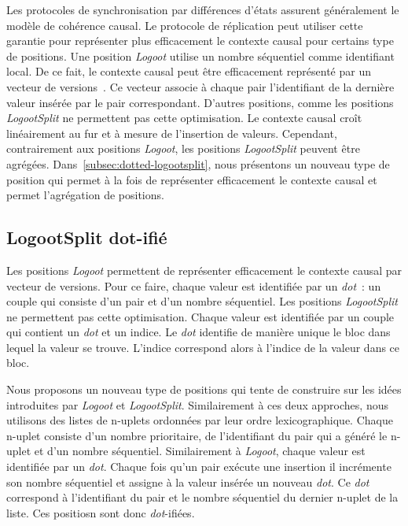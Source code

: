 Les protocoles de synchronisation par différences d'états assurent généralement le modèle de cohérence causal.
Le protocole de réplication peut utiliser cette garantie pour représenter plus efficacement le contexte causal pour certains type de positions.
Une position \emph{Logoot} utilise un nombre séquentiel comme identifiant local.
De ce fait, le contexte causal peut être efficacement représenté par un vecteur de versions~\autocite{parker_1983_versionvector,mattern_1988_timevector}.
Ce vecteur associe à chaque pair l'identifiant de la dernière valeur insérée par le pair correspondant.
D'autres positions, comme les positions \emph{LogootSplit} ne permettent pas cette optimisation.
Le contexte causal croît linéairement au fur et à mesure de l'insertion de valeurs.
Cependant, contrairement aux positions \emph{Logoot}, les positions \emph{LogootSplit} peuvent être agrégées.
Dans~\autoref{subsec:dotted-logootsplit}, nous présentons un nouveau type de position qui permet à la fois de représenter efficacement le contexte causal et permet l'agrégation de positions.


\subsection{LogootSplit dot-ifié}\label{subsec:dotted-logootsplit}

Les positions \emph{Logoot} permettent de représenter efficacement le contexte causal par vecteur de versions.
Pour ce faire, chaque valeur est identifiée par un \emph{dot}~: un couple qui consiste d'un pair et d'un nombre séquentiel.
Les positions \emph{LogootSplit} ne permettent pas cette optimisation.
Chaque valeur est identifiée par un couple qui contient un \emph{dot} et un indice.
Le \emph{dot} identifie de manière unique le bloc dans lequel la valeur se trouve.
L'indice correspond alors à l'indice de la valeur dans ce bloc.

Nous proposons un nouveau type de positions qui tente de construire sur les idées introduites par \emph{Logoot} et \emph{LogootSplit}.
Similairement à ces deux approches, nous utilisons des listes de n-uplets ordonnées par leur ordre lexicographique.
Chaque n-uplet consiste d'un nombre prioritaire, de l'identifiant du pair qui a généré le n-uplet et d'un nombre séquentiel. 
Similairement à \emph{Logoot}, chaque valeur est identifiée par un \emph{dot}.
Chaque fois qu'un pair exécute une insertion il incrémente son nombre séquentiel et assigne à la valeur insérée un nouveau \emph{dot}.
Ce \emph{dot} correspond à l'identifiant du pair et le nombre séquentiel du dernier n-uplet de la liste.
Ces positiosn sont donc \emph{dot}-ifiées.

